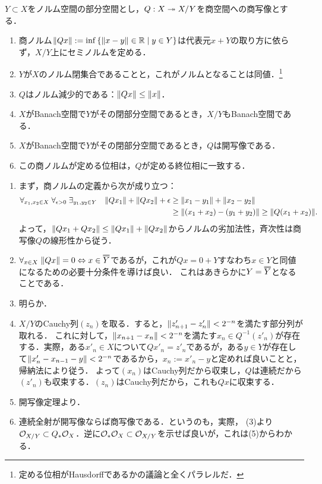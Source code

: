 \documentclass[uplatex,dvipdfmx]{jsreport}
\begin{document}
\begin{proposition}[商空間]\label{prop-quotient-Banach-space}
    $Y\subset X$をノルム空間の部分空間とし，$Q:X\twoheadrightarrow X/Y$を商空間への商写像とする．
    \begin{enumerate}
        \item 商ノルム$\|Qx\|:=\inf\left\{\|x-y\|\in\mathbb{R}\mid y\in Y\right\}$は代表元$x+Y$の取り方に依らず，$X/Y$上にセミノルムを定める．
        \item $Y$が$X$のノルム閉集合であることと，これがノルムとなることは同値．\footnote{定める位相がHausdorffであるかの議論と全くパラレルだ．}
        \item $Q$はノルム減少的である：$\|Qx\|\le\|x\|$．
        \item $X$がBanach空間で$Y$がその閉部分空間であるとき，$X/Y$もBanach空間である．
        \item $X$がBanach空間で$Y$がその閉部分空間であるとき，$Q$は開写像である．
        \item この商ノルムが定める位相は，$Q$が定める終位相に一致する．
    \end{enumerate}
\end{proposition}
\begin{Proof}\mbox{}
    \begin{enumerate}
        \item まず，商ノルムの定義から次が成り立つ：
        \begin{align*}
            \forall_{x_1,x_2\in X}\;\forall_{\epsilon>0}\;\exists_{y_1,y_2\in Y}\quad\|Qx_1\|+\|Qx_2\|+\epsilon&\ge\|x_1-y_1\|+\|x_2-y_2\|\\
            &\ge\|(x_1+x_2)-(y_1+y_2)\|\ge\|Q(x_1+x_2)\|.
        \end{align*}
        よって，$\|Qx_1+Qx_2\|\le\|Qx_1\|+\|Qx_2\|$からノルムの劣加法性，斉次性は商写像$Q$の線形性から従う．
        \item $\forall_{x\in X}\;\norm{Qx}=0\Leftrightarrow x\in\oo{Y}$であるが，これが$Qx=0+Y$すなわち$x\in Y$と同値になるための必要十分条件を導けば良い．
        これはあきらかに$Y=\oo{Y}$となることである．
        \item 明らか．
        \item $X/Y$のCauchy列$(z_n)$を取る．すると，$\|z'_{n+1}-z'_n\|<2^{-n}$を満たす部分列が取れる．
        これに対して，$\|x_{n+1}-x_n\|<2^{-n}$を満たす$x_n\in Q^{-1}(z'_n)$が存在する．実際，ある$x'_n\in X$について$Qx'_n=z'_n$であるが，ある$y\in Y$が存在して$\|x'_n-x_{n-1}-y\|<2^{-n}$であるから，$x_n:=x'_n-y$と定めれば良いことと，帰納法により従う．
        よって$(x_n)$はCauchy列だから収束し，$Q$は連続だから$(z'_n)$も収束する．$(z_n)$はCauchy列だから，これも$Qx$に収束する．
        \item 開写像定理より．
        \item 連続全射が開写像ならば商写像である．というのも，実際，
        (3)より$\mathcal{O}_{X/Y}\subset Q_*\mathcal{O}_X$．逆に$\mathcal{O}_*\mathcal{O}_X\subset\mathcal{O}_{X/Y}$を示せば良いが，これは(5)からわかる．
    \end{enumerate}
\end{Proof}
\end{document}
